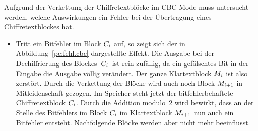 Aufgrund der Verkettung der Chiffretextblöcke im CBC Mode muss untersucht werden, welche Auswirkungen ein Fehler bei der Übertragung eines Chiffretextblockes
hat.
\begin{itemize}
  \item Tritt ein Bitfehler im Block $C_i$ auf, so zeigt sich der in Abbildung~\ref{pc:fehl.cbc} dargestellte Effekt. Die Ausgabe bei der Dechiffrierung
  des Blockes \,$C_i$ \,ist rein zufällig, da ein gefälschtes Bit in der Eingabe die Ausgabe völlig verändert. Der ganze Klartextblock $M_i$ ist
  also zerstört. Durch die Verkettung der Blöcke wird auch noch Block $M_{i+1}$ in Mitleidenschaft gezogen. Im Speicher steht jetzt der
  bitfehlerbehaftete Chiffretextblock $C_i$. Durch die Addition modulo~2  wird bewirkt, dass an der Stelle des Bitfehlers im Block $C_i$ im
  Klartextblock $M_{i+1}$ nun auch ein Bitfehler entsteht. Nachfolgende Blöcke werden aber nicht mehr beeinflusst.
\end{itemize}

